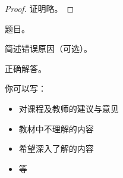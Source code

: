 \documentclass[11pt, a4paper, UTF8]{ctexart}
\begin{document}

\begin{proof}
  证明略。	
\end{proof}

\begincorrection	%

\begin{problem}[题号]
  题目。
\end{problem}

\begin{cause}
  简述错误原因（可选）。
\end{cause}

\begin{revision}
  正确解答。
\end{revision}
\beginfb	%

你可以写：
\begin{itemize}
  \item 对课程及教师的建议与意见
  \item 教材中不理解的内容
  \item 希望深入了解的内容
  \item 等
\end{itemize}
\end{document}
